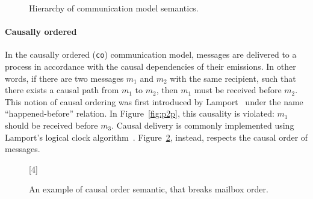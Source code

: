\bigskip

\begin{figure}[!ht]
\centering
{}
\caption{Hierarchy of communication model semantics.}
\label{fig:coms}
\end{figure}

\paragraph{Causally ordered}
In the causally ordered (\verb|co|) communication model, messages are delivered 
to a process in accordance with the causal dependencies of their emissions. 
In other words, if there are two messages $m_1$ and $m_2$ with the same recipient, 
such that there exists a causal path from $m_1$ to $m_2$, then $m_1$ must be received 
before $m_2$. This notion of causal ordering was first introduced by 
Lamport~\cite{lamport2019time} under the 
name ``happened-before'' relation. In Figure~\ref{fig:p2p}, this 
causality is violated: $m_1$ should be received before $m_3$. Causal delivery 
is commonly implemented using Lamport's logical clock algorithm~\cite{lamport2019time}.
Figure~\ref{fig:causalorder}, instead, respects the causal order of messages.

\begin{figure}[!ht]
	\centering
	\begin{msc}[draw frame=none, draw head=none, msc keyword=, 
				head height=0px, label distance=0.5ex, 
				foot height=0px, foot distance=0px]{}

		[4]
		\nextlevel
		\nextlevel
		\nextlevel
	\end{msc}
	\caption{An example of causal order semantic, that breaks mailbox order.}
	\label{fig:causalorder}
\end{figure}

